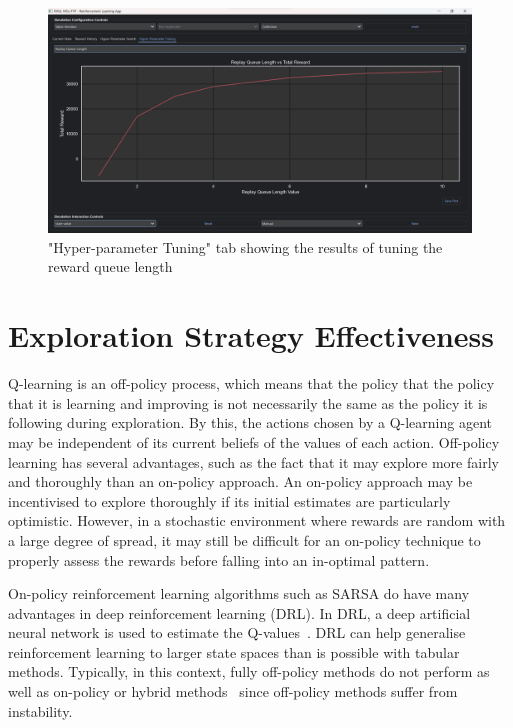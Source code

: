 \documentclass[]{final_report}
\begin{document}
\begin{figure}[H]
  \centering
  
  \includegraphics[trim={0 0 0 6mm},clip,width=\textwidth]{ui-screenshots/hyper-tuning.png}
  
  \caption{\label{fig:screenshot:current-state} "Hyper-parameter Tuning" tab showing the results of tuning the reward queue length}
\end{figure}


\chapter{Exploration Strategy Effectiveness}
\label{chap:exploration-strategy-effectiveness}
Q-learning is an off-policy process, which means that the policy that the policy that it is learning and improving is not necessarily the same as the policy it is following during exploration. By this, the actions chosen by a Q-learning agent may be independent of its current beliefs of the values of each action. Off-policy learning has several advantages, such as the fact that it may explore more fairly and thoroughly than an on-policy approach. An on-policy approach may be incentivised to explore thoroughly if its initial estimates are particularly optimistic. However, in a stochastic environment where rewards are random with a large degree of spread, it may still be difficult for an on-policy technique to properly assess the rewards before falling into an in-optimal pattern.  

On-policy reinforcement learning algorithms such as SARSA do have many advantages in deep reinforcement learning (DRL). In DRL, a deep artificial neural network is used to estimate the Q-values~\cite{deepRLOverview}. DRL can help generalise reinforcement learning to larger state spaces than is possible with tabular methods. Typically, in this context, fully off-policy methods do not perform as well as on-policy or hybrid methods~\cite{deepOnVsOffPolicy} since off-policy methods suffer from instability\cite{sutton2018reinforcement}.
\end{document}
